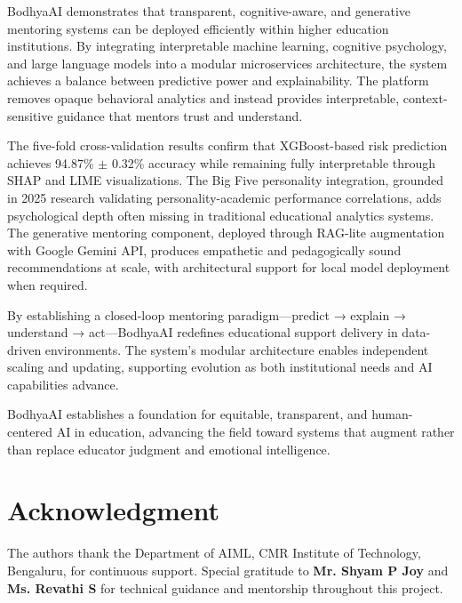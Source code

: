 \documentclass[conference]{IEEEtran}
\begin{document}
BodhyaAI demonstrates that transparent, cognitive-aware, and generative mentoring systems can be deployed efficiently within higher education institutions. By integrating interpretable machine learning, cognitive psychology, and large language models into a modular microservices architecture, the system achieves a balance between predictive power and explainability. The platform removes opaque behavioral analytics and instead provides interpretable, context-sensitive guidance that mentors trust and understand.

The five-fold cross-validation results confirm that XGBoost-based risk prediction achieves 94.87\% $\pm$ 0.32\% accuracy while remaining fully interpretable through SHAP and LIME visualizations. The Big Five personality integration, grounded in 2025 research validating personality-academic performance correlations, adds psychological depth often missing in traditional educational analytics systems. The generative mentoring component, deployed through RAG-lite augmentation with Google Gemini API, produces empathetic and pedagogically sound recommendations at scale, with architectural support for local model deployment when required.

By establishing a closed-loop mentoring paradigm—predict → explain → understand → act—BodhyaAI redefines educational support delivery in data-driven environments. The system's modular architecture enables independent scaling and updating, supporting evolution as both institutional needs and AI capabilities advance.

BodhyaAI establishes a foundation for equitable, transparent, and human-centered AI in education, advancing the field toward systems that augment rather than replace educator judgment and emotional intelligence.

\section*{Acknowledgment}
The authors thank the Department of AIML, CMR Institute of Technology, Bengaluru, for continuous support. Special gratitude to \textbf{Mr. Shyam P Joy} and \textbf{Ms. Revathi S} for technical guidance and mentorship throughout this project.
\end{document}
